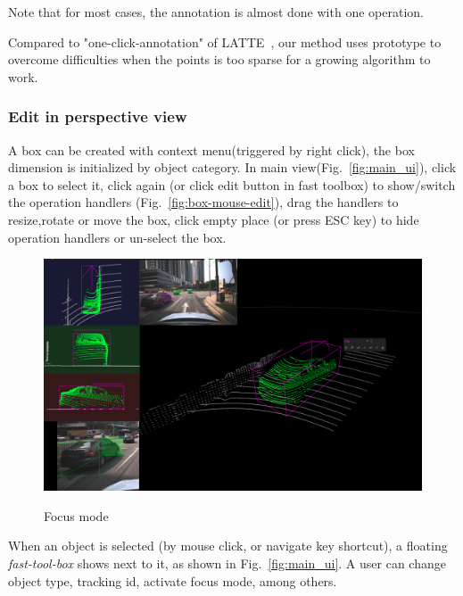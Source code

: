 \documentclass[letterpaper, 10 pt, conference]{ieeeconf}  %
\begin{document}
Note that for most cases, the annotation is almost done with one operation.

Compared to "one-click-annotation" of LATTE~\cite{pointatme}, our method uses prototype to overcome difficulties when the points is too sparse for a growing algorithm to work.

\subsubsection{Edit in perspective view}
A box can be created with context menu(triggered by right click), the box dimension is initialized by object category. In main view(Fig.~\ref{fig:main_ui}), click a box to select it, click again (or click edit button in fast toolbox) to show/switch the operation handlers (Fig.~\ref{fig:box-mouse-edit}), drag the handlers to resize,rotate or move the box, click empty place (or press ESC key) to hide operation handlers or un-select the box.

\begin{figure}[!th]
	\centering	
	\includegraphics[width=0.9\linewidth]{./figures/focus-mode}\\
	\caption{Focus mode}
	\label{fig:focus-mode}
\end{figure}

When an object is selected (by mouse click, or navigate key shortcut), a floating \emph{fast-tool-box} shows next to it, as shown in Fig.~\ref{fig:main_ui}. A user can change object type, tracking id, activate focus mode, among others.
\end{document}
